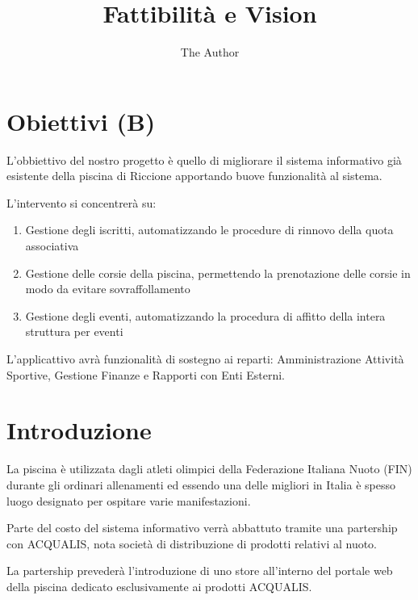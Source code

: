 \documentclass[11pt]{article} %
\title{Fattibilità e Vision}
\author{The Author}
\begin{document}
\maketitle

\section{Obiettivi (B)}

L'obbiettivo del nostro progetto è quello di migliorare il sistema informativo già esistente della piscina di Riccione apportando buove funzionalità al sistema.

L'intervento si concentrerà su:

\begin{enumerate}
	\item Gestione degli iscritti, automatizzando le procedure di rinnovo della quota associativa
	\item Gestione delle corsie della piscina, permettendo la prenotazione delle corsie in modo da evitare sovraffollamento
	\item Gestione degli eventi, automatizzando la procedura di affitto della intera struttura per eventi
\end{enumerate}

L'applicattivo avrà funzionalità di sostegno ai reparti: Amministrazione Attività Sportive,  Gestione Finanze e Rapporti con Enti Esterni.



\section{Introduzione}


La piscina è utilizzata dagli atleti olimpici della Federazione Italiana Nuoto (FIN) durante gli ordinari allenamenti ed essendo una delle migliori in Italia è spesso luogo designato per ospitare varie manifestazioni.

Parte del costo del sistema informativo verrà abbattuto tramite una partership con ACQUALIS, nota società di distribuzione di prodotti relativi al nuoto.

La partership prevederà l'introduzione di uno store all'interno del portale web della piscina dedicato esclusivamente ai prodotti ACQUALIS.
\end{document}
